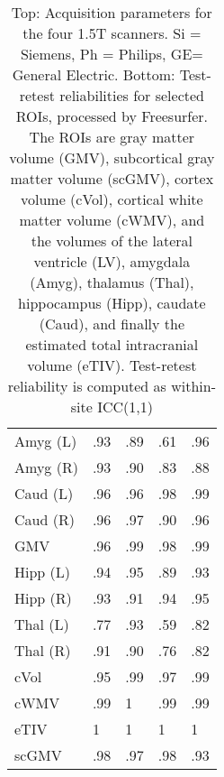 \begin{table}
\begin{tabular}{lllll}
Amyg (L)              &               .93 &               .89 &                 .61 &                 .96 \\
Amyg (R)              &               .93 &               .90 &                 .83 &                 .88 \\
Caud (L)              &               .96 &               .96 &                 .98 &                 .99 \\
Caud (R)              &               .96 &               .97 &                 .90 &                 .96 \\
GMV                   &               .96 &               .99 &                 .98 &                 .99 \\
Hipp (L)              &               .94 &               .95 &                 .89 &                 .93 \\
Hipp (R)              &               .93 &               .91 &                 .94 &                 .95 \\
Thal (L)              &               .77 &               .93 &                 .59 &                 .82 \\
Thal (R)              &               .91 &               .90 &                 .76 &                 .82 \\
cVol                  &               .95 &               .99 &                 .97 &                 .99 \\
cWMV                  &               .99 &               1 &                 .99 &                 .99 \\
eTIV                  &               1 &               1 &                 1 &                 1 \\
scGMV                 &               .98 &               .97 &                 .98 &                 .93 \\
\bottomrule
\end{tabular}
\caption{Top: Acquisition parameters for the four 1.5T scanners. Si = Siemens, Ph = Philips, GE= General Electric. Bottom: Test-retest reliabilities for selected ROIs, processed by Freesurfer. The ROIs are gray matter volume (GMV), subcortical gray matter volume (scGMV), cortex volume (cVol), cortical white matter volume (cWMV), and the volumes of the lateral ventricle (LV), amygdala (Amyg), thalamus (Thal), hippocampus (Hipp), caudate (Caud), and finally the estimated total intracranial volume (eTIV). Test-retest reliability is computed as within-site ICC(1,1)} 
\label{tab:acquisition1}

\end{table}